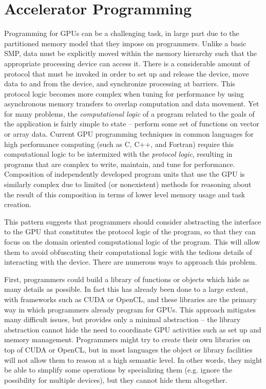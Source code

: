 
\section{Accelerator Programming}

Programming for GPUs can be a challenging task, in large part due to the
partitioned memory model that they impose on programmers. Unlike a basic SMP,
data must be explicitly moved within the memory hierarchy such that the
appropriate processing device can access it. There is a considerable amount of
protocol that must be invoked in order to set up and release the device, move
data to and from the device, and synchronize processing at barriers. This
protocol logic becomes more complex when tuning for performance by using
asynchronous memory transfers to overlap computation and data movement. Yet
for many problems, the \emph{computational logic} of a program related to the
goals of the application is fairly simple to state -- perform some set of
functions on vector or array data. Current GPU programming techniques in
common languages for high performance computing (such as C, C++, and Fortran)
require this computational logic to be intermixed with the \emph{protocol
logic}, resulting in programs that are complex to write, maintain, and tune
for performance. Composition of independently developed program units that use
the GPU is similarly complex due to limited (or nonexistent) methods for
reasoning about the result of this composition in terms of lower level memory
usage and task creation.

This pattern suggests that programmers should consider abstracting the
interface to the GPU that constitutes the protocol logic of the program, so
that they can focus on the domain oriented computational logic of the program.
This will allow them to avoid obfuscating their computational logic with the
tedious details of interacting with the device. There are numerous ways to
approach this problem.

First, programmers could build a library of functions or objects which hide as
many details as possible. In fact this has already been done to a large
extent, with frameworks such as CUDA or OpenCL, and these libraries are the
primary way in which programmers already program for GPUs. This approach
mitigates many difficult issues, but provides only a minimal abstraction --
the library abstraction cannot hide the need to coordinate GPU activities such
as set up and memory management. Programmers might try to create their own
libraries on top of CUDA or OpenCL, but in most languages the object or
library facilities will not allow them to reason at a high semantic level. In
other words, they might be able to simplify some operations by specializing
them (e.g. ignore the possibility for multiple devices), but they cannot hide
them altogether.

